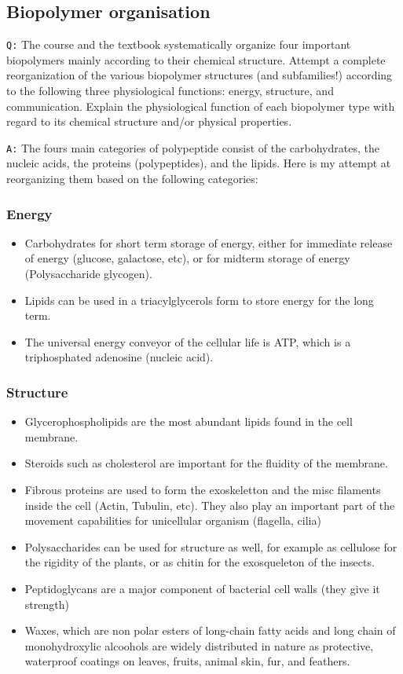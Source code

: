 \documentclass[11pt, a4paper,titlepage]{article}
\begin{document}
\subsection{Biopolymer organisation}
\label{sec-2-1}

\texttt{Q:} The course and the textbook systematically organize four important
biopolymers mainly according to their chemical structure. Attempt a
complete reorganization of the various biopolymer structures (and
subfamilies!) according to the following three physiological
functions: energy, structure, and communication. Explain the
physiological function of each biopolymer type with regard to its
chemical structure and/or physical properties.

\texttt{A:} The fours main categories of polypeptide consist of the
carbohydrates, the nucleic acids, the proteins (polypeptides), and the
lipids. Here is my attempt at reorganizing them based on the following
categories:
\subsubsection{Energy}
\label{sec-2-1-1}

\begin{itemize}
\item Carbohydrates for short term storage of energy, either for immediate
  release of energy (glucose, galactose, etc), or for midterm storage
  of energy (Polysaccharide glycogen).
\item Lipids can be used in a triacylglycerols form to store energy for
  the long term.
\item The universal energy conveyor of the cellular life is ATP, which is
  a triphosphated adenosine (nucleic acid).
\end{itemize}
\subsubsection{Structure}
\label{sec-2-1-2}

\begin{itemize}
\item Glycerophospholipids are the most abundant lipids found in the cell
  membrane.
\item Steroids such as cholesterol are important for the fluidity of the
  membrane.
\item Fibrous proteins are used to form the exoskeletton and the
  misc filaments inside the cell (Actin, Tubulin, etc). They also
  play an important part of the movement capabilities for unicellular
  organism (flagella, cilia)
\item Polysaccharides can be used for structure as well, for example as
  cellulose for the rigidity of the plants, or as chitin for the
  exosqueleton of the insects.
\item Peptidoglycans are a major component of bacterial cell walls (they
  give it strength)
\item Waxes, which are non polar esters of long-chain fatty acids and
  long chain of monohydroxylic alcoohols are widely distributed in
  nature as protective, waterproof coatings on leaves, fruits, animal
  skin, fur, and feathers.
\end{itemize}
\end{document}
